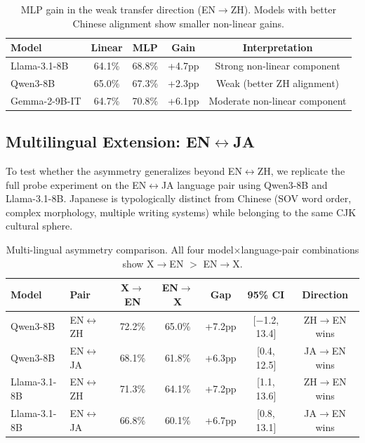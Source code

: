 \documentclass{article}
\begin{document}
\begin{table}[t]
\centering
\caption{MLP gain in the weak transfer direction (EN$\to$ZH). Models with better Chinese alignment show smaller non-linear gains.}
\label{tab:mlp}
\small
\begin{tabular}{lcccc}
\toprule
Model & Linear & MLP & Gain & Interpretation \\
\midrule
Llama-3.1-8B & 64.1\% & 68.8\% & +4.7pp & Strong non-linear component \\
Qwen3-8B & 65.0\% & 67.3\% & +2.3pp & Weak (better ZH alignment) \\
Gemma-2-9B-IT & 64.7\% & 70.8\% & +6.1pp & Moderate non-linear component \\
\bottomrule
\end{tabular}
\end{table}

\subsection{Multilingual Extension: EN$\leftrightarrow$JA}
\label{sec:multilingual}

To test whether the asymmetry generalizes beyond EN$\leftrightarrow$ZH, we replicate the full probe experiment on the EN$\leftrightarrow$JA language pair using Qwen3-8B and Llama-3.1-8B. Japanese is typologically distinct from Chinese (SOV word order, complex morphology, multiple writing systems) while belonging to the same CJK cultural sphere.

\begin{table}[t]
\centering
\caption{Multi-lingual asymmetry comparison. All four model$\times$language-pair combinations show X$\to$EN $>$ EN$\to$X.}
\label{tab:multilingual}
\small
\begin{tabular}{llccccc}
\toprule
Model & Pair & X$\to$EN & EN$\to$X & Gap & 95\% CI & Direction \\
\midrule
Qwen3-8B & EN$\leftrightarrow$ZH & 72.2\% & 65.0\% & +7.2pp & [$-$1.2, 13.4] & ZH$\to$EN wins \\
Qwen3-8B & EN$\leftrightarrow$JA & 68.1\% & 61.8\% & +6.3pp & [0.4, 12.5] & JA$\to$EN wins \\
Llama-3.1-8B & EN$\leftrightarrow$ZH & 71.3\% & 64.1\% & +7.2pp & [1.1, 13.6] & ZH$\to$EN wins \\
Llama-3.1-8B & EN$\leftrightarrow$JA & 66.8\% & 60.1\% & +6.7pp & [0.8, 13.1] & JA$\to$EN wins \\
\bottomrule
\end{tabular}
\end{table}
\end{document}
